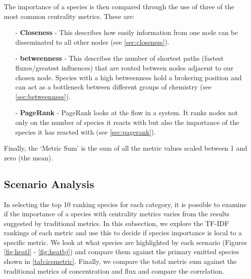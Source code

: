 The importance of a species is then compared through the use of three of the most common centrality metrics. These are:


\begin{itemize}
\item[-] \textbf{Closeness} - This describes how easily information from one node can be disseminated to all other nodes (see \autoref{sec:closeness}).
\item[-] \textbf{ betweenness} - This describes the number of shortest paths (fastest fluxes/greatest influences) that are routed between nodes adjacent to our chosen node. Species with a high betweenness hold a brokering position and can act as a bottleneck between different groups of chemistry (see \autoref{sec:betweenness}).
\item[-] \textbf{PageRank} - PageRank looks at the flow in a system. It ranks nodes not only on the number of species it reacts with but also the importance of the species it has reacted with (see \autoref{sec:pagerank}).

\end{itemize}

Finally, the `Metric Sum' is the sum of all the metric values scaled between 1 and zero (the mean).

\subsection{Scenario Analysis}
In selecting the top 10 ranking species for each category, it is possible to examine if the importance of a species with centrality metrics varies from the results suggested by traditional metrics. In this subsection, we explore the TF-IDF rankings of each metric and use this to decide if species importance is local to a specific metric. We look at what species are highlighted by each scenario (Figures \ref{fig:heatl} - \ref{fig:heatbj}) and compare them against the primary emitted species shown in \autoref{tab:icsmetric}. Finally, we compare the total metric sum against the traditional metrics of concentration and flux and compare the correlation.
%
%
%

%


